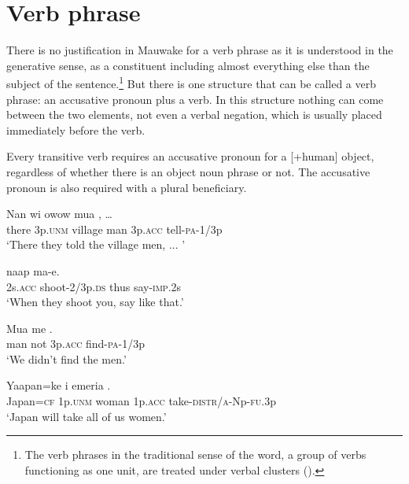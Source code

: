 \section{Verb phrase}
{}
There is no justification in Mauwake for a verb phrase as it is understood in the generative sense, as a constituent including almost everything else than the subject of the sentence.\footnote{The verb phrases in the traditional sense of the word, a group of verbs functioning as one unit, are treated under verbal clusters ().}  But there is one structure that can be called a verb phrase: an accusative pronoun plus a verb.  In this structure nothing can come between the two elements, not even a verbal negation, which is usually placed immediately before the verb.

Every transitive verb requires an accusative pronoun for a [+human] object, regardless of whether there is an object noun phrase or not. The accusative pronoun is also required with a plural beneficiary. 

\ea%
\label{ex:4:x848}
\gll Nan  wi  owow  mua   ,  {\dots} \\
  there  3p.\textsc{unm}  village  man  3p.\textsc{acc}  tell-\textsc{pa}-1/3p    \\
\glt`There they told the village men, ... '
\z

\ea%
\label{ex:4:x852}
\gll {}   naap  ma-e. \\
    2s.\textsc{acc}  shoot-2/3p.\textsc{ds}  thus  say-\textsc{imp}.2s  \\
\glt`When they shoot you, say like that.'
\z

\ea%
\label{ex:4:x849}
\gll Mua  me   . \\
   man  not  3p.\textsc{acc}  find-\textsc{pa}-1/3p   \\
\glt`We didn't find the men.'
\z

\ea%
\label{ex:4:x850}
\gll Yaapan=ke  i  emeria   . \\
   Japan=\textsc{cf}  1p.\textsc{unm}  woman  1p.\textsc{acc}  take-\textsc{distr}/\textsc{a}-Np-\textsc{fu}.3p   \\
\glt`Japan will take all of us women.'
\z

